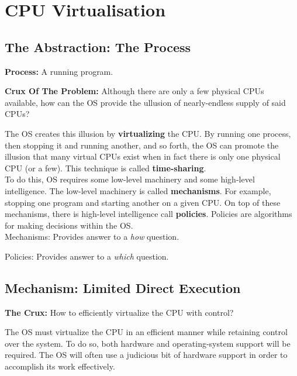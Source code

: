 \chapter{CPU Virtualisation}

\section{The Abstraction: The Process}

\textbf{Process:} A running program.\\

\begin{tcolorbox}
    \textbf{Crux Of The Problem:} Although there are only a few physical CPUs
    available, how can the OS provide the ullusion of nearly-endless supply of 
    said CPUs?\\
\end{tcolorbox}

The OS creates this illusion by \textbf{virtualizing} the CPU. By running
one process, then stopping it and running another, and so forth, the OS can
promote the illusion that many virtual CPUs exist when in fact there is only
one physical CPU (or a few). This technique is called \textbf{time-sharing}.\\

To do this, OS requires some low-level machinery and some
high-level intelligence. The low-level machinery is called \textbf{mechanisms}.
For example, stopping one program and starting another on a given CPU. On top
of these mechanisms, there is high-level intelligence call \textbf{policies}.
Policies are algorithms for making decisions within the OS.\\

Mechanisms: Provides answer to a \textit{how} question.

Policies: Provides answer to a \textit{which} question.

\section{Mechanism: Limited Direct Execution}

\begin{tcolorbox}
    \textbf{The Crux:} How to efficiently virtualize the CPU with control?
\end{tcolorbox}

The OS must virtualize the CPU in an efficient manner while retaining control
over the system. To do so, both hardware and operating-system support will be
required. The OS will often use a judicious bit of hardware support in order to
accomplish its work effectively.

